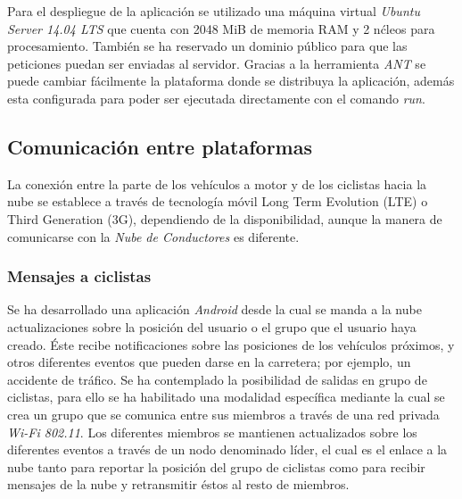 Para el despliegue de la aplicación se utilizado una máquina virtual \emph{Ubuntu Server 14.04 LTS} que cuenta con 2048 MiB de memoria RAM y 2 n\'cleos para procesamiento. También se ha reservado un dominio público para que las peticiones puedan ser enviadas al servidor. Gracias a la herramienta \emph{ANT} se puede cambiar fácilmente la plataforma donde se distribuya la aplicación, además esta configurada para poder ser ejecutada directamente con el comando \emph{run}.


\subsection{Comunicación entre plataformas}\label{ssection:comunicacion_plataformas}
La conexión entre la parte de los vehículos a motor y de los ciclistas hacia la nube se establece a través de tecnología móvil Long Term Evolution (LTE) o Third Generation (3G), dependiendo de la disponibilidad, aunque la manera de comunicarse con la \emph{Nube de Conductores} es diferente.

\subsubsection{Mensajes a ciclistas}\label{sssection:mensajes_ciclistas}
Se ha desarrollado una aplicación \emph{Android} desde la cual se manda a la nube actualizaciones sobre la posición del usuario o el grupo que el usuario haya creado. \'Este recibe notificaciones sobre las posiciones de los vehículos próximos, y otros diferentes eventos que pueden darse en la carretera; por ejemplo, un accidente de tráfico. Se ha contemplado la posibilidad de salidas en grupo de ciclistas, para ello se ha habilitado una modalidad específica mediante la cual se crea un grupo que se comunica entre sus miembros a través de una red privada \emph{Wi-Fi 802.11}. Los diferentes miembros se mantienen actualizados sobre los diferentes eventos a través de un nodo denominado líder, el cual es el enlace a la nube tanto para reportar la posición del grupo de ciclistas como para recibir mensajes de la nube y retransmitir éstos al resto de miembros.

